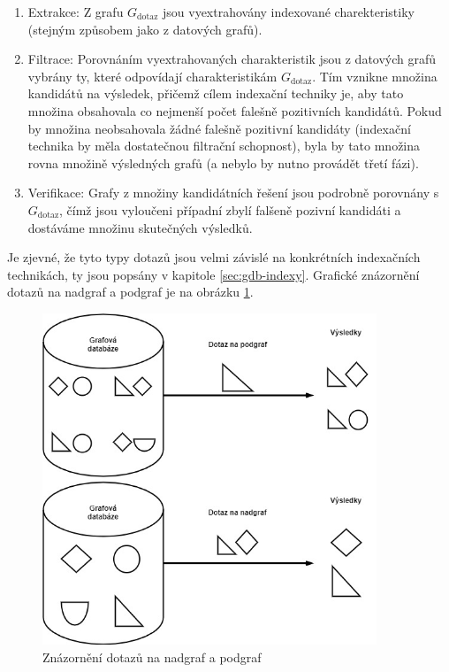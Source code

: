 \begin{enumerate}
	\item{Extrakce:} Z grafu \textit{$G_\mathrm{dotaz}$} jsou vyextrahovány indexované charekteristiky (stejným způsobem jako z datových grafů).
	\item{Filtrace:} Porovnáním vyextrahovaných charakteristik jsou z datových grafů vybrány ty, které odpovídají charakteristikám \textit{$G_\mathrm{dotaz}$}. Tím vznikne množina kandidátů na výsledek, přičemž cílem indexační techniky je, aby tato množina obsahovala co nejmenší počet falešně pozitivních kandidátů. Pokud by množina neobsahovala žádné falešně pozitivní kandidáty (indexační technika by měla dostatečnou filtrační schopnost), byla by tato množina rovna množině výsledných grafů (a nebylo by nutno provádět třetí fázi).
	\item{Verifikace:} Grafy z množiny kandidátních řešení jsou podrobně porovnány s \textit{$G_\mathrm{dotaz}$}, čímž jsou vyloučeni případní zbylí falšeně pozivní kandidáti a dostáváme množinu skutečných výsledků.
\end{enumerate}

Je zjevné, že tyto typy dotazů jsou velmi závislé na konkrétních indexačních technikách, ty jsou popsány v kapitole \ref{sec:gdb-indexy}. Grafické znázornění dotazů na nadgraf a podgraf je na obrázku \ref{fig:supergraph_subgraph_query}.

\begin{figure}
\begin{center}
\includegraphics[width=10cm]{figures/supergraph_subgraph_query}
\caption{Znázornění dotazů na nadgraf a podgraf}
\label{fig:supergraph_subgraph_query}
\end{center}
\end{figure}

